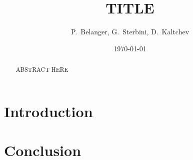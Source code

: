 \documentclass{cernatsnote}
\title{TITLE}
\author{P.~Belanger, G.~Sterbini, D.~Kaltchev}
\date{\today}
\begin{document}
\maketitle

\begin{abstract}
ABSTRACT HERE
\end{abstract}



\section{Introduction}


\section{Conclusion}



%
%
\end{document}

